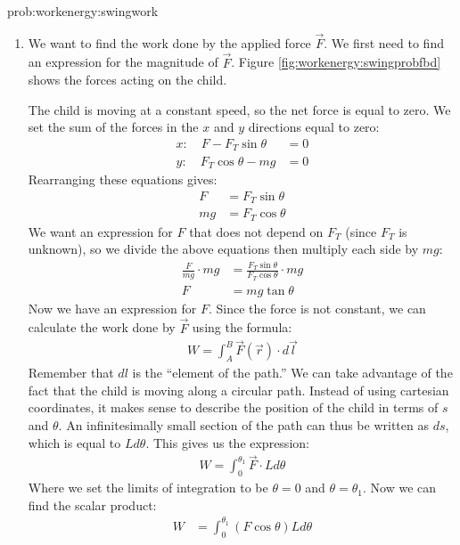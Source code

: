 \begin{solution}{prob:workenergy:swingwork}\label{soln:workenergy:swingwork}
\begin{enumerate}[label=\alph*)]
\item We want to find the work done by the applied force $\vec F$. We first need to find an expression for the magnitude of $\vec F$. Figure \ref{fig:workenergy:swingprobfbd} shows the forces acting on the child. 

The child is moving at a constant speed, so the net force is equal to zero. We set the sum of the forces in the $x$ and $y$ directions equal to zero:
\begin{align*}
x: \quad F-F_T\sin\theta &=0\\
y: \quad F_T\cos\theta -mg &= 0
\end{align*} 
Rearranging these equations gives:
\begin{align*}
F&=F_T\sin\theta\\
mg&=F_T\cos\theta
\end{align*}
We want an expression for $F$ that does not depend on $F_T$ (since $F_T$ is unknown), so we divide the above equations then multiply each side by $mg$:
\begin{align*}
\frac{F}{mg}\cdot mg &= \frac{F_T\sin\theta}{F_T\cos\theta}\cdot mg\\
F&=mg\tan\theta
\end{align*}
Now we have an expression for $F$. Since the force is not constant, we can calculate the work done by $\vec F$ using the formula:
\begin{align*}
W=\int_A^B\vec F(\vec r) \cdot d\vec l
\end{align*} 
Remember that $dl$ is the ``element of the path.'' We can take advantage of the fact that the child is moving along a circular path. Instead of using cartesian coordinates, it makes sense to describe the position of the child in terms of $s$ and $\theta$. An infinitesimally small section of the path can thus be written as $ds$, which is equal to $Ld\theta$. This gives us the expression:
\begin{align*}
W=\int_0^{\theta_1}\vec F \cdot Ld\theta
\end{align*}
Where we set the limits of integration to be $\theta=0$ and $\theta=\theta_1$. Now we can find the scalar product:
\begin{align*}
W&=\int_0^{\theta_1}(F\cos\theta)Ld\theta\\

\end{align*}
\end{enumerate}
\end{solution}
